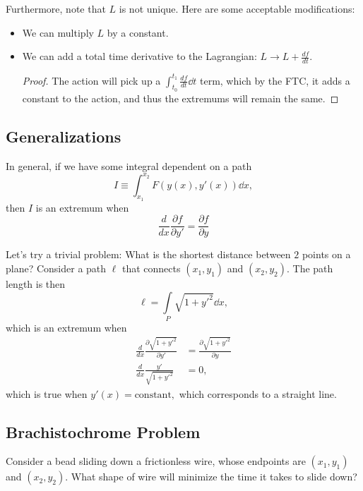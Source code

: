 \documentclass{article}
\numberwithin{equation}{section}
\begin{document}
Furthermore, note that $L$ is not unique. Here are some acceptable modifications:
\begin{itemize}
    \item We can multiply $L$ by a constant.
    \item We can add a total time derivative to the Lagrangian: $L \to L + \frac{df}{dt}.$
    \begin{proof}
        The action will pick up a $\int_{t_0}^{t_1} \frac{df}{dt} \dd{t}$ term, which by the FTC, it adds a constant to the action, and thus the extremums will remain the same.
    \end{proof}
\end{itemize}
\subsection{Generalizations}
In general, if we have some integral dependent on a path 
\begin{equation}
    I \equiv \int_{x_1}^{x_2} F(y(x),y'(x)) \dd{x},
\end{equation}
then $I$ is an extremum when
\begin{equation}
    \frac{d}{dx}\frac{\partial f}{\partial y'} = \frac{\partial f}{\partial y}
\end{equation}
\begin{example}
    Let's try a trivial problem: What is the shortest distance between $2$ points on a plane? Consider a path $\ell$ that connects $(x_1,y_1)$ and $(x_2,y_2)$. The path length is then
    \begin{equation}
        \ell = \int\limits_{P}\sqrt{1+y'^2}\dd{x},
    \end{equation}
    which is an extremum when
    \begin{align}
        \frac{d}{dx}\frac{\partial \sqrt{1+y'^2}}{\partial y'} &= \frac{\partial \sqrt{1+y'^2}}{\partial y} \\ 
        \frac{d}{dx} \frac{y'}{\sqrt{1+y'^2}} &= 0,
    \end{align}
    which is true when $y'(x)=\text{constant},$ which corresponds to a straight line.
\end{example}
\subsection{Brachistochrome Problem}
Consider a bead sliding down a frictionless wire, whose endpoints are $(x_1,y_1)$ and $(x_2,y_2)$. What shape of wire will minimize the time it takes to slide down?
\end{document}
